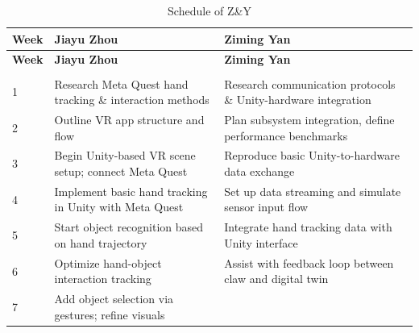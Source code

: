 \documentclass{senior-design}
\begin{document}
\begin{longtable}{|p{}|p{}|p{}|}
    \caption{Schedule of Z\&Y}\label{longtable2} \\  %
    \hline
    \textbf{Week} & \textbf{Jiayu Zhou} & \textbf{Ziming Yan} \\  %
    \hline
    \endfirsthead  %

    \hline
    \textbf{Week} & \textbf{Jiayu Zhou} & \textbf{Ziming Yan} \\  %
    \hline
    \endhead  %

    \hline
    \endfoot  %

    \hline
    \multicolumn{3}{|c|}{\textit{End of the Table}} \\  %
    \hline
    \endlastfoot  %
    \hline

1 

&Research Meta Quest hand tracking \& interaction methods 

&Research communication protocols \& Unity-hardware integration 
\\
\hline
2 

&Outline VR app structure and flow 

&Plan subsystem integration, define performance benchmarks 
\\
\hline
3 

&Begin Unity-based VR scene setup; connect Meta Quest 

&Reproduce basic Unity-to-hardware data exchange 
\\
\hline
4 


&Implement basic hand tracking in Unity with Meta Quest 

&Set up data streaming and simulate sensor input flow 
\\
\hline
5 

&Start object recognition based on hand trajectory 

&Integrate hand tracking data with Unity interface 
\\
\hline
6 

&Optimize hand-object interaction tracking 

&Assist with feedback loop between claw and digital twin 
\\
\hline
7 


&Add object selection via gestures; refine visuals 


\end{longtable}
\end{document}

